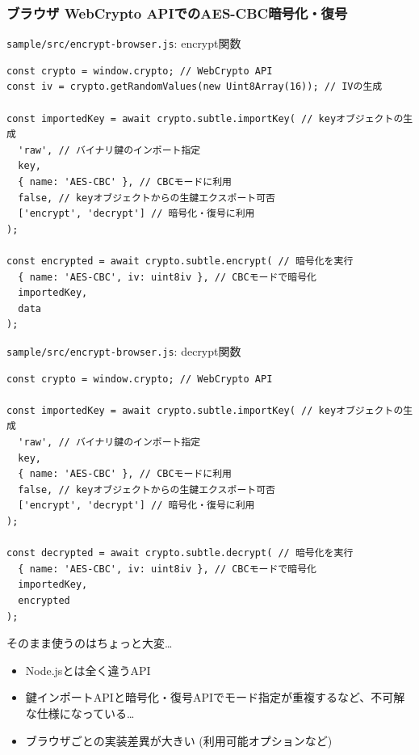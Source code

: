 \documentclass[12pt,dvipdfmx]{beamer}
\begin{document}
\begin{frame}[fragile]
\frametitle{ブラウザ WebCrypto APIでのAES-CBC暗号化・復号}

\begin{block}{\small \texttt{sample/src/encrypt-browser.js}: encrypt関数}
\scriptsize
\begin{verbatim}
const crypto = window.crypto; // WebCrypto API
const iv = crypto.getRandomValues(new Uint8Array(16)); // IVの生成

const importedKey = await crypto.subtle.importKey( // keyオブジェクトの生成
  'raw', // バイナリ鍵のインポート指定
  key,
  { name: 'AES-CBC' }, // CBCモードに利用
  false, // keyオブジェクトからの生鍵エクスポート可否
  ['encrypt', 'decrypt'] // 暗号化・復号に利用
);

const encrypted = await crypto.subtle.encrypt( // 暗号化を実行
  { name: 'AES-CBC', iv: uint8iv }, // CBCモードで暗号化
  importedKey,
  data
);
\end{verbatim}
\end{block}
\end{frame}

\begin{frame}[fragile]
\begin{block}{\small \texttt{sample/src/encrypt-browser.js}: decrypt関数}
\scriptsize
\begin{verbatim}
const crypto = window.crypto; // WebCrypto API

const importedKey = await crypto.subtle.importKey( // keyオブジェクトの生成
  'raw', // バイナリ鍵のインポート指定
  key,
  { name: 'AES-CBC' }, // CBCモードに利用
  false, // keyオブジェクトからの生鍵エクスポート可否
  ['encrypt', 'decrypt'] // 暗号化・復号に利用
);

const decrypted = await crypto.subtle.decrypt( // 暗号化を実行
  { name: 'AES-CBC', iv: uint8iv }, // CBCモードで暗号化
  importedKey,
  encrypted
);
\end{verbatim}
\end{block}

{\footnotesize
そのまま使うのはちょっと大変…
\begin{itemize}
 \item Node.jsとは全く違うAPI
 \item 鍵インポートAPIと暗号化・復号APIでモード指定が重複するなど、不可解な仕様になっている…
 \item \alert{ブラウザごとの実装差異が大きい} (利用可能オプションなど)
\end{itemize}
}
\end{frame}
\end{document}
